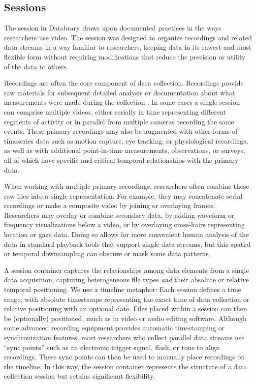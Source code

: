 \documentclass{sig-alternate}
\begin{document}
\subsection{Sessions}

The session in Databrary draws upon documented practices in the ways researchers use video. 
The session was designed to organize recordings and related data streams in a way familiar to researchers, keeping data in its rawest and most flexible form without requiring  modifications that reduce the precision or utility of the data to others.

Recordings are often the core component of data collection.
Recordings provide raw materials for subsequent detailed analysis or documentation about what measurements were made during the collection \cite{Bakeman_2012}.
In some cases a single session can comprise multiple videos, either serially in time representing different segments of activity or in parallel from multiple cameras recording the same events.
These primary recordings may also be augmented with other forms of timeseries data such as motion capture, eye tracking, or physiological recordings, as well as with additional point-in-time measurements, observations, or surveys, all of which have specific and critical temporal relationships with the primary data.

When working with multiple primary recordings, researchers often combine these raw files into a single representation.
For example, they may concatenate serial recordings or make a composite video by joining or overlaying frames.
Researchers may overlay or combine secondary data, by adding waveform or frequency visualizations below a video, or by overlaying cross-hairs representing location or gaze data.
Doing so allows for more convenient human analysis of the data in standard playback tools that support single data streams, but this spatial or temporal downsampling can obscure or mask some data patterns.

A session container captures the relationships among data elements from a single data acquisition, capturing heterogeneous file types \emph{and} their absolute or relative temporal positioning.
We use a timeline metaphor: Each session defines a time range, with absolute timestamps representing the exact time of data collection or relative positioning with an optional date.
Files placed within a session can then be (optionally) positioned, much as in video or audio editing software.
Although some advanced recording equipment provides automatic timestamping or synchronization features, most researchers who collect parallel data streams use ``sync points'' such as an electronic trigger signal, flash, or tone to align recordings.
These sync points can then be used to manually place recordings on the timeline.
In this way, the session container represents the structure of a data collection session but retains significant flexibility.
\end{document}
